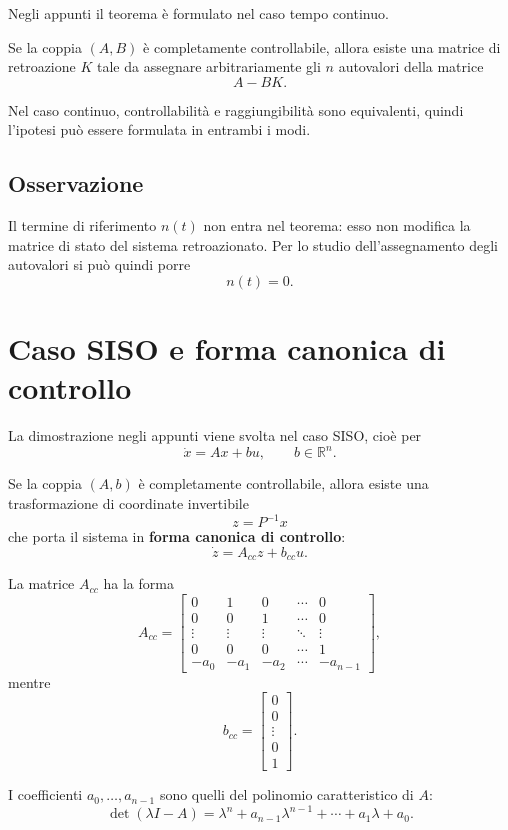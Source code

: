 Negli appunti il teorema è formulato nel caso tempo continuo.

\begin{theorem}
Se la coppia \((A,B)\) è completamente controllabile, allora esiste una matrice di retroazione \(K\)
tale da assegnare arbitrariamente gli \(n\) autovalori della matrice
\[
A-BK.
\]
\end{theorem}

Nel caso continuo, controllabilità e raggiungibilità sono equivalenti,
quindi l'ipotesi può essere formulata in entrambi i modi.

\subsection*{Osservazione}

Il termine di riferimento \(n(t)\) non entra nel teorema:
esso non modifica la matrice di stato del sistema retroazionato.
Per lo studio dell'assegnamento degli autovalori si può quindi porre
\[
n(t)=0.
\]

\section{Caso SISO e forma canonica di controllo}

La dimostrazione negli appunti viene svolta nel caso SISO, cioè per
\[
\dot x=Ax+bu,
\qquad b\in\mathbb{R}^n.
\]

Se la coppia \((A,b)\) è completamente controllabile,
allora esiste una trasformazione di coordinate invertibile
\[
z=P^{-1}x
\]
che porta il sistema in \textbf{forma canonica di controllo}:
\[
\dot z=A_{cc}z+b_{cc}u.
\]

La matrice \(A_{cc}\) ha la forma
\[
A_{cc}=
\begin{bmatrix}
0 & 1 & 0 & \cdots & 0\\
0 & 0 & 1 & \cdots & 0\\
\vdots & \vdots & \vdots & \ddots & \vdots\\
0 & 0 & 0 & \cdots & 1\\
-a_0 & -a_1 & -a_2 & \cdots & -a_{n-1}
\end{bmatrix},
\]
mentre
\[
b_{cc}=
\begin{bmatrix}
0\\
0\\
\vdots\\
0\\
1
\end{bmatrix}.
\]

I coefficienti \(a_0,\dots,a_{n-1}\) sono quelli del polinomio caratteristico di \(A\):
\[
\det(\lambda I-A)
=
\lambda^n+a_{n-1}\lambda^{n-1}+\cdots+a_1\lambda+a_0.
\]

